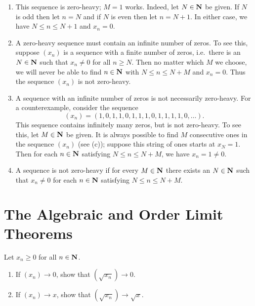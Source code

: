 \documentclass{lew98_solutions}
\begin{document}
\begin{solution}
    \begin{enumerate}
        \item This sequence is zero-heavy; \( M = 1 \) works. Indeed, let \( N \in \mathbf{N} \) be given. If \( N \) is odd then let \( n = N \) and if \( N \) is even then let \( n = N + 1 \). In either case, we have \( N \leq n \leq N + 1 \) and \( x_n = 0 \).

        \item A zero-heavy sequence must contain an infinite number of zeros. To see this, suppose \( (x_n) \) is a sequence with a finite number of zeros, i.e.\ there is an \( N \in \mathbf{N} \) such that \( x_n \neq 0 \) for all \( n \geq N \). Then no matter which \( M \) we choose, we will never be able to find \( n \in \mathbf{N} \) with \( N \leq n \leq N + M \) and \( x_n = 0 \). Thus the sequence \( (x_n) \) is not zero-heavy.

        \item A sequence with an infinite number of zeros is not necessarily zero-heavy. For a counterexample, consider the sequence
        \[
            (x_n) = (1, 0, 1, 1, 0, 1, 1, 1, 0, 1, 1, 1, 1, 0, \ldots).
        \]
        This sequence contains infinitely many zeros, but is not zero-heavy. To see this, let \( M \in \mathbf{N} \) be given. It is always possible to find \( M \) consecutive ones in the sequence \( (x_n) \) (see  (c)); suppose this string of ones starts at \( x_N = 1 \). Then for each \( n \in \mathbf{N} \) satisfying \( N \leq n \leq N + M \), we have \( x_n = 1 \neq 0 \).

        \item A sequence is not zero-heavy if for every \( M \in \mathbf{N} \) there exists an \( N \in \mathbf{N} \) such that \( x_n \neq 0 \) for each \( n \in \mathbf{N} \) satisfying \( N \leq n \leq N + M \).
    \end{enumerate}
\end{solution}

\section{The Algebraic and Order Limit Theorems}
\label{sec:2.3}

\begin{exercise}
\label{ex:2.3.1}
    Let \( x_n \geq 0 \) for all \( n \in \mathbf{N} \).
    \begin{enumerate}
        \item If \( (x_n) \to 0 \), show that \( ( \sqrt{x_n} ) \to 0 \).

        \item If \( (x_n) \to x \), show that \( ( \sqrt{x_n} ) \to \sqrt{x} \).
    \end{enumerate}
\end{exercise}
\end{document}
